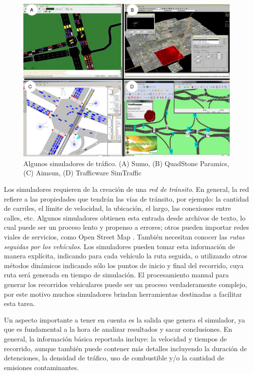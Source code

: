 \begin{figure}[ht]
	\centering
	\includegraphics[width=0.9\linewidth]{Figures/simuladores}
	\caption[]{Algunos simuladores de tráfico. (A) Sumo, (B) QuadStone Paramics, (C) Aimsun, (D) Trafficware SimTraffic}
	\label{fig:simuladores}
\end{figure}

Los simuladores requieren de la creación de una \emph{red de tránsito}. En general, la red refiere a las propiedades que tendrán las vías de tránsito, por ejemplo: la cantidad de carriles, el límite de velocidad, la ubicación, el largo, las conexiones entre calles, etc. Algunos simuladores obtienen esta entrada desde archivos de texto, lo cual puede ser un proceso lento y propenso a errores; otros pueden importar redes viales de servicios, como Open Street Map \citep{OSM}. También necesitan conocer las\emph{ rutas seguidas por los vehículos}. Los simuladores pueden tomar esta información de manera explícita, indicando para cada vehículo la ruta seguida, o utilizando otros métodos dinámicos indicando sólo los puntos de inicio y final del recorrido, cuya ruta será generada en tiempo de simulación. El procesamiento manual para generar los recorridos vehiculares puede ser un proceso verdaderamente complejo, por este motivo muchos simuladores brindan herramientas destinadas a facilitar esta tarea.

Un aspecto importante a tener en cuenta es la salida que genera el simulador, ya que es fundamental a la hora de analizar resultados y sacar conclusiones. En general, la información básica reportada incluye: la velocidad y tiempos de recorrido, aunque también puede contener más detalles incluyendo la duración de detenciones, la densidad de tráfico, uso de combustible y/o la cantidad de emisiones contaminantes.  
 
